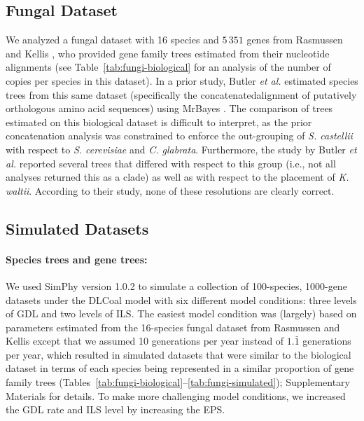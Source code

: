 \subsection{Fungal Dataset}
We analyzed a fungal dataset with 16 species and $5\,351$ genes from Rasmussen and Kellis \cite{rasmussen2012unified}, who provided gene family trees estimated from their nucleotide alignments (see Table~\ref{tab:fungi-biological} for an analysis of the number of copies per species in this dataset).
In a prior study, Butler {\em et al.} \cite{butler2009evolution} estimated species trees from this same dataset (specifically the \gls{concatenatedalignment} of putatively orthologous amino acid sequences) using MrBayes \cite{ronquist2003mrbayes}.
The comparison of trees estimated on this biological dataset is difficult to interpret, as the prior concatenation analysis was constrained to enforce the out-grouping of {\em S. castellii} with respect to {\em S. cerevisiae} and {\em C. glabrata}.
Furthermore, the study by Butler {\em et al.} \cite{butler2009evolution} reported several trees that differed with respect to this group (i.e., not all analyses returned this as a clade) as well as with respect to the placement of {\em K. waltii}.
According to their study, none of these resolutions are clearly correct.

\subsection{Simulated Datasets}
\paragraph{Species trees and gene trees:}
We used \gls{SimPhy} version 1.0.2 to simulate a collection of 100-species, 1000-gene datasets under the DLCoal model with six different model conditions: three levels of GDL and two levels of ILS.
The easiest model condition was (largely) based on parameters estimated from the 16-species fungal dataset from Rasmussen and Kellis \cite{rasmussen2012unified} except that we assumed 10 generations per year instead of $1.\bar{1}$ generations per year, which resulted in simulated datasets that were similar to the biological dataset in terms of each species being represented in a similar proportion of gene family trees (Tables~\ref{tab:fungi-biological}--\ref{tab:fungi-simulated}); Supplementary Materials for details.
To make more challenging model conditions, we increased the GDL rate and ILS level by increasing the \gls{EPS}.

